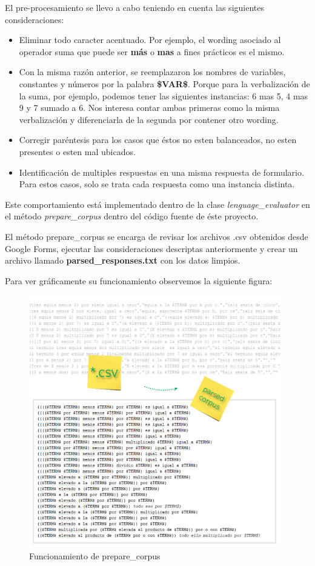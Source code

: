 El pre-procesamiento se llevo a cabo teniendo en cuenta las siguientes consideraciones:

\begin{itemize}
    \item Eliminar todo caracter acentuado. Por ejemplo, el wording asociado al operador suma que puede ser \textbf{más} o \textbf{mas} a fines prácticos es el mismo.
    \item Con la misma razón anterior, se reemplazaron los nombres de variables, constantes y números por la palabra \textbf{\$VAR\$}. Porque para la verbalización de la suma, por ejemplo, podemos tener las siguientes instancias: 6 mas 5, 4 mas 9 y 7 sumado a 6. Nos interesa contar ambas primeras como la misma verbalización y diferenciarla de la segunda por contener otro wording.
    \item Corregir paréntesis para los casos que éstos no esten balanceados, no esten presentes o esten mal ubicados.
    \item Identificación de multiples respuestas en una misma respuesta de formulario. Para estos casos, solo se trata cada respuesta como una instancia distinta.
\end{itemize}

Este comportamiento está implementado dentro de la clase \textit{lenguage\_evaluator} en el método \textit{prepare\_corpus} dentro del código fuente de éste proyecto.

El método prepare\_corpus se encarga de revisar los archivos .csv obtenidos desde Google Forms, ejecutar las consideraciones descriptas anteriormente y crear un archivo llamado \textbf{parsed\_responses.txt} con los datos limpios.

Para ver gráficamente su funcionamiento observemos la siguiente figura:

\begin{figure}[H]
\centering
	\includegraphics[width=11cm, height=11cm]{Figures/parsed_corpus}
	\caption[]{Funcionamiento de prepare\_corpus}
\label{fig:parsed_corpus}
\end{figure}

